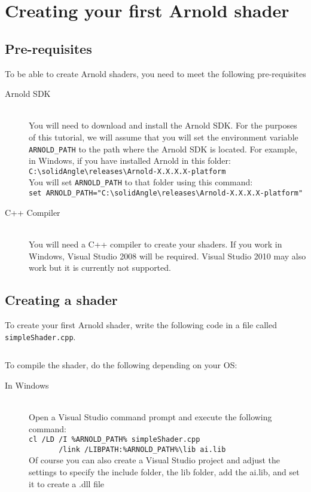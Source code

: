 \section{Creating your first Arnold shader}

\subsection{Pre-requisites}

To be able to create Arnold shaders, you need to meet the following pre-requisites

\begin{description}

\item[Arnold SDK] \hfill \\
You will need to download and install the Arnold SDK. For the purposes of this tutorial, we will assume that you will set the environment variable \texttt{ARNOLD\_PATH} to the path where the Arnold SDK is located. For example, in Windows, if you have installed Arnold in this folder:\\
\verb|C:\solidAngle\releases\Arnold-X.X.X.X-platform|\\
You will set \texttt{ARNOLD\_PATH} to that folder using this command:\\
{\footnotesize \verb|set ARNOLD_PATH="C:\solidAngle\releases\Arnold-X.X.X.X-platform"| }

\item[C++ Compiler] \hfill \\
You will need a C++ compiler to create your shaders. If you work in Windows, Visual Studio 2008 will be required. Visual Studio 2010 may also work but it is currently not supported.
\end{description}

\subsection{Creating a shader}

To create your first Arnold shader, write the following code in a file called \texttt{simpleShader.cpp}.

\inputminted[mathescape,
linenos,
numbersep=5pt,
frame=lines,
framesep=2mm,
baselinestretch=1,
fontsize=\footnotesize,
tabsize=3,
label=simpleShader.cpp]
{c++}{simpleShader.cpp}

To compile the shader, do the following depending on your OS:

\begin{description}

\item[In Windows] \hfill \\
Open a Visual Studio command prompt and execute the following command:\\
\verb|cl /LD /I %ARNOLD_PATH% simpleShader.cpp|\\
\verb|       /link /LIBPATH:%ARNOLD_PATH%\lib ai.lib|\\
Of course you can also create a Visual Studio project and adjust the settings to specify the include folder, the lib folder, add the ai.lib, and set it to create a .dll file

\end{description}

